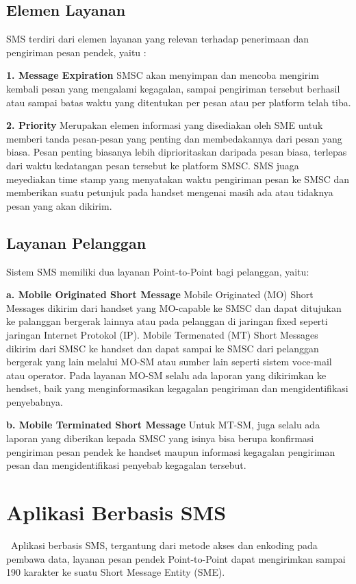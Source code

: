 \documentclass{jtetiproposalskripsi}
\begin{document}
\subsection{Elemen Layanan}
SMS terdiri dari elemen layanan yang relevan terhadap penerimaan dan pengiriman pesan pendek, yaitu :

\textbf{1.	Message Expiration}
SMSC akan menyimpan dan mencoba mengirim kembali pesan yang mengalami kegagalan, sampai pengiriman tersebut berhasil atau sampai batas waktu yang ditentukan per pesan atau per platform telah tiba.

\textbf{2.	Priority}
Merupakan elemen informasi yang disediakan oleh SME untuk memberi tanda pesan-pesan yang penting dan membedakannya dari pesan yang biasa. Pesan penting biasanya lebih diprioritaskan daripada pesan biasa, terlepas dari waktu kedatangan pesan tersebut ke platform SMSC. SMS juaga meyediakan time stamp yang menyatakan waktu pengiriman pesan ke SMSC dan memberikan suatu petunjuk pada handset mengenai masih ada atau tidaknya pesan yang akan dikirim.

\subsection{Layanan Pelanggan}

	Sistem SMS memiliki dua layanan Point-to-Point bagi pelanggan, yaitu:
	
\textbf{a.	Mobile Originated Short Message}
Mobile Originated (MO) Short Messages dikirim dari handset yang MO-capable ke SMSC dan dapat ditujukan ke palanggan bergerak lainnya atau pada pelanggan di jaringan fixed seperti jaringan Internet Protokol (IP). 
Mobile Termenated (MT) Short Messages dikirim dari SMSC ke handset dan dapat sampai ke SMSC dari pelanggan bergerak  yang lain melalui MO-SM atau sumber lain seperti sistem voce-mail atau operator.
Pada layanan MO-SM selalu ada laporan yang dikirimkan ke hendset, baik yang menginformasikan kegagalan pengiriman  dan mengidentifikasi penyebabnya. 

\textbf{b.	Mobile Terminated Short Message}
Untuk MT-SM, juga selalu ada laporan yang diberikan kepada SMSC yang isinya bisa berupa konfirmasi pengiriman pesan pendek ke handset maupun informasi kegagalan pengiriman pesan dan mengidentifikasi penyebab kegagalan tersebut.

\section{Aplikasi Berbasis SMS}\
Aplikasi berbasis SMS, tergantung dari metode akses dan enkoding pada pembawa data, layanan pesan pendek Point-to-Point dapat mengirimkan sampai 190 karakter ke suatu Short Message Entity (SME).
\end{document}
